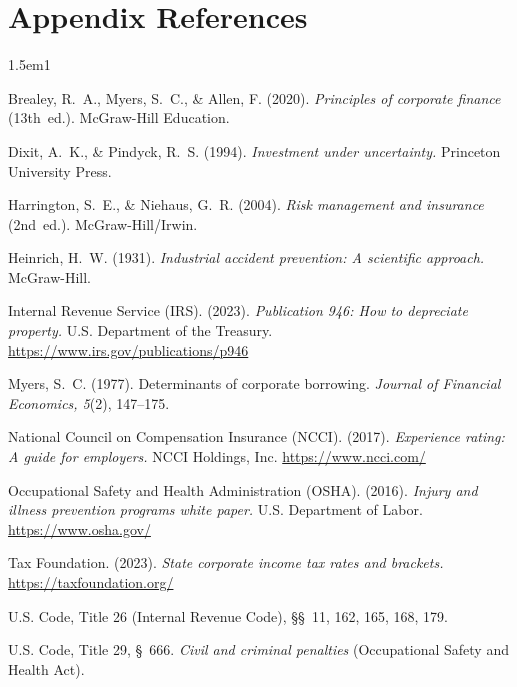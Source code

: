 \documentclass[11pt,openany]{book}
\begin{document}
\section*{Appendix References}
\begingroup
\sloppy

\begin{hangparas}{1.5em}{1}

Brealey, R.~A., Myers, S.~C., \& Allen, F. (2020). \emph{Principles of
corporate finance} (13th~ed.). McGraw-Hill Education.

Dixit, A.~K., \& Pindyck, R.~S. (1994). \emph{Investment under uncertainty.}
Princeton University Press.

Harrington, S.~E., \& Niehaus, G.~R. (2004). \emph{Risk management and
insurance} (2nd~ed.). McGraw-Hill/Irwin.

Heinrich, H.~W. (1931). \emph{Industrial accident prevention: A scientific
approach.} McGraw-Hill.

Internal Revenue Service (IRS). (2023). \emph{Publication 946: How to
depreciate property.} U.S. Department of the Treasury.
\url{https://www.irs.gov/publications/p946}

Myers, S.~C. (1977). Determinants of corporate borrowing. \emph{Journal of
Financial Economics, 5}(2), 147--175.

National Council on Compensation Insurance (NCCI). (2017). \emph{Experience
rating: A guide for employers.} NCCI Holdings, Inc.
\url{https://www.ncci.com/}

Occupational Safety and Health Administration (OSHA). (2016). \emph{Injury and
illness prevention programs white paper.} U.S. Department of Labor.
\url{https://www.osha.gov/}

Tax Foundation. (2023). \emph{State corporate income tax rates and brackets.}
\url{https://taxfoundation.org/}

U.S. Code, Title 26 (Internal Revenue Code), \S\S~11, 162, 165, 168, 179.

U.S. Code, Title 29, \S~666. \emph{Civil and criminal penalties} (Occupational
Safety and Health Act).

\end{hangparas}

\endgroup

\clearpage
\renewcommand{\thesection}{\thechapter.\arabic{section}}
\renewcommand{\thesubsection}{\thesection.\arabic{subsection}}
\renewcommand{\theHsection}{\theHchapter.\arabic{section}}
\renewcommand{\theHsubsection}{\theHsection.\arabic{subsection}}
\end{document}

